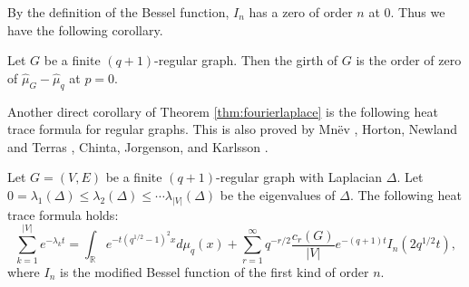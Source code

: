 \documentclass{article}
\begin{document}
By the definition of the Bessel function, $I_n$ has a zero of order $n$ at $0$. Thus we have the following corollary.

\begin{corollary}
    Let $G$ be a finite $(q+1)$-regular graph. Then the girth of $G$ is the order of zero of $\hat{\mu}_G-\hat{\mu}_q$ at $p=0$.
\end{corollary}

Another direct corollary of Theorem \ref{thm:fourierlaplace} is the following heat trace formula for regular graphs. This is also proved by Mn\"ev \cite{Mnev07}, Horton, Newland and Terras \cite{HNT06}, Chinta, Jorgenson, and Karlsson \cite{CJK15}.

\begin{corollary}\label{heattraceformula}
Let $G=(V,E)$ be a finite $(q+1)$-regular graph with Laplacian $\Delta$. Let $0=\lambda_1(\Delta) \leq \lambda_2(\Delta) \leq \cdots \lambda_{|V|}(\Delta)$ be the eigenvalues of $\Delta$. The following heat trace formula holds:
\begin{equation*}
\sum_{k=1}^{|V|}e^{-\lambda_kt}=\int_{\mathbb{R}}e^{-t\left(q^{1/2}-1\right)^2 x} d\mu_q(x)+\sum_{r=1}^\infty q^{-r/2}\frac{c_r(G)}{|V|}e^{-(q+1)t}I_n(2q^{1/2}t),
    \end{equation*}
where $I_n$ is the modified Bessel function of the first kind of order $n$.
\end{corollary}
\end{document}

